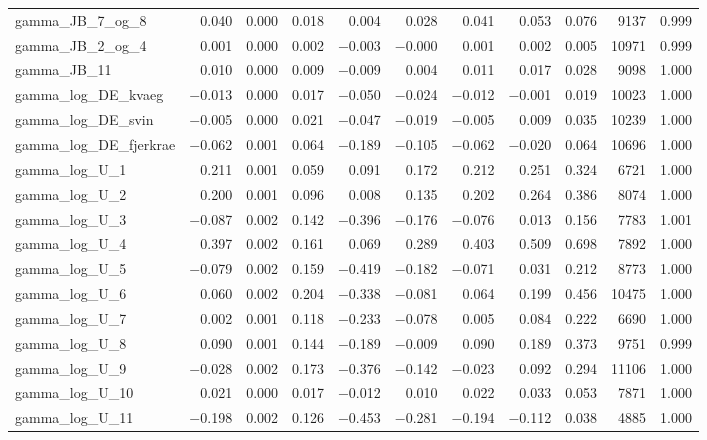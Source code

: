 \documentclass[12pt]{article}
\begin{document}
\begin{longtable}{lrrrrrrrrrr}
gamma\_JB\_7\_og\_8  &  0.040 & 0.000 & 0.018 &  0.004 &  0.028 &  0.041 &  0.053 &  0.076 &  9137 & 0.999 \\
gamma\_JB\_2\_og\_4  &  0.001 & 0.000 & 0.002 & $-$0.003 & $-$0.000 &  0.001 &  0.002 &  0.005 & 10971 & 0.999 \\
gamma\_JB\_11        &  0.010 & 0.000 & 0.009 & $-$0.009 &  0.004 &  0.011 &  0.017 &  0.028 &  9098 & 1.000 \\
gamma\_log\_DE\_kvaeg    & $-$0.013 & 0.000 & 0.017 & $-$0.050 & $-$0.024 & $-$0.012 & $-$0.001 &  0.019 & 10023 & 1.000 \\
gamma\_log\_DE\_svin     & $-$0.005 & 0.000 & 0.021 & $-$0.047 & $-$0.019 & $-$0.005 &  0.009 &  0.035 & 10239 & 1.000 \\
gamma\_log\_DE\_fjerkrae & $-$0.062 & 0.001 & 0.064 & $-$0.189 & $-$0.105 & $-$0.062 & $-$0.020 &  0.064 & 10696 & 1.000 \\
gamma\_log\_U\_1  &  0.211 & 0.001 & 0.059 &  0.091 &  0.172 &  0.212 &  0.251 &  0.324 &  6721 & 1.000 \\
gamma\_log\_U\_2  &  0.200 & 0.001 & 0.096 &  0.008 &  0.135 &  0.202 &  0.264 &  0.386 &  8074 & 1.000 \\
gamma\_log\_U\_3  & $-$0.087 & 0.002 & 0.142 & $-$0.396 & $-$0.176 & $-$0.076 &  0.013 &  0.156 &  7783 & 1.001 \\
gamma\_log\_U\_4  &  0.397 & 0.002 & 0.161 &  0.069 &  0.289 &  0.403 &  0.509 &  0.698 &  7892 & 1.000 \\
gamma\_log\_U\_5  & $-$0.079 & 0.002 & 0.159 & $-$0.419 & $-$0.182 & $-$0.071 &  0.031 &  0.212 &  8773 & 1.000 \\
gamma\_log\_U\_6  &  0.060 & 0.002 & 0.204 & $-$0.338 & $-$0.081 &  0.064 &  0.199 &  0.456 & 10475 & 1.000 \\
gamma\_log\_U\_7  &  0.002 & 0.001 & 0.118 & $-$0.233 & $-$0.078 &  0.005 &  0.084 &  0.222 &  6690 & 1.000 \\
gamma\_log\_U\_8  &  0.090 & 0.001 & 0.144 & $-$0.189 & $-$0.009 &  0.090 &  0.189 &  0.373 &  9751 & 0.999 \\
gamma\_log\_U\_9  & $-$0.028 & 0.002 & 0.173 & $-$0.376 & $-$0.142 & $-$0.023 &  0.092 &  0.294 & 11106 & 1.000 \\
gamma\_log\_U\_10 &  0.021 & 0.000 & 0.017 & $-$0.012 &  0.010 &  0.022 &  0.033 &  0.053 &  7871 & 1.000 \\
gamma\_log\_U\_11 & $-$0.198 & 0.002 & 0.126 & $-$0.453 & $-$0.281 & $-$0.194 & $-$0.112 &  0.038 &  4885 & 1.000 \\

\end{longtable}
\end{document}
